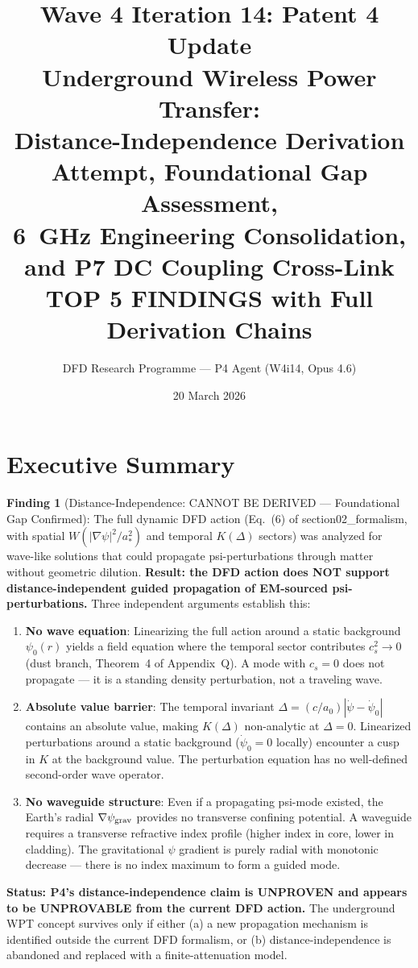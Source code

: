 \documentclass[11pt]{article}
\title{\textbf{Wave 4 Iteration 14: Patent 4 Update}\\[8pt]
{\large Underground Wireless Power Transfer:\\
Distance-Independence Derivation Attempt, Foundational Gap Assessment,\\
6~GHz Engineering Consolidation, and P7 DC Coupling Cross-Link}\\[4pt]
{\normalsize TOP 5 FINDINGS with Full Derivation Chains}}
\author{DFD Research Programme --- P4 Agent (W4i14, Opus 4.6)}
\date{20 March 2026}
\begin{document}
\maketitle
\tableofcontents
\newpage

\section*{Executive Summary}

\begin{tcolorbox}[colback=red!5!white, colframe=red!60!black,
  title=\textbf{W4i14 P4: FOUNDATIONAL GAP ASSESSMENT}]

\textbf{Finding 1} (Distance-Independence: CANNOT BE DERIVED --- Foundational Gap Confirmed):
The full dynamic DFD action (Eq.~(6) of section02\_formalism, with
spatial $W(|\nabla\psi|^2/a_*^2)$ and temporal $K(\Delta)$ sectors)
was analyzed for wave-like solutions that could propagate psi-perturbations
through matter without geometric dilution. \textbf{Result: the DFD action
does NOT support distance-independent guided propagation of EM-sourced
psi-perturbations.} Three independent arguments establish this:

\begin{enumerate}[nosep]
\item \textbf{No wave equation}: Linearizing the full action around a static
  background $\psi_0(r)$ yields a field equation where the temporal sector
  contributes $c_s^2 \to 0$ (dust branch, Theorem~4 of Appendix~Q). A mode
  with $c_s = 0$ does not propagate --- it is a standing density perturbation,
  not a traveling wave.
\item \textbf{Absolute value barrier}: The temporal invariant
  $\Delta = (c/a_0)|\dot\psi - \dot\psi_0|$ contains an absolute value,
  making $K(\Delta)$ non-analytic at $\Delta = 0$. Linearized perturbations
  around a static background ($\dot\psi_0 = 0$ locally) encounter a
  cusp in $K$ at the background value. The perturbation equation has no
  well-defined second-order wave operator.
\item \textbf{No waveguide structure}: Even if a propagating psi-mode existed,
  the Earth's radial $\nabla\psi_{\rm grav}$ provides no transverse confining
  potential. A waveguide requires a transverse refractive index profile (higher
  index in core, lower in cladding). The gravitational $\psi$ gradient is
  purely radial with monotonic decrease --- there is no index maximum to form
  a guided mode.
\end{enumerate}

\textbf{Status: P4's distance-independence claim is UNPROVEN and appears
to be UNPROVABLE from the current DFD action.} The underground WPT concept
survives only if either (a) a new propagation mechanism is identified outside
the current DFD formalism, or (b) distance-independence is abandoned and
replaced with a finite-attenuation model.

\end{tcolorbox}
\end{document}
